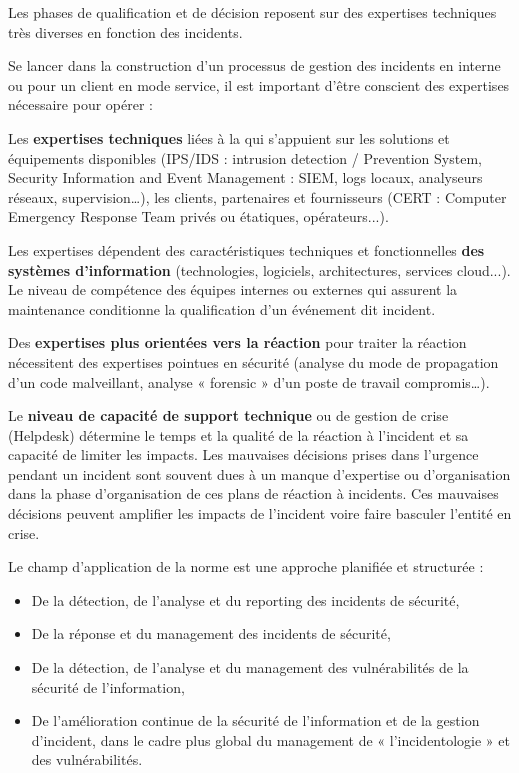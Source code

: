 Les phases de qualification et de décision reposent sur des expertises techniques très diverses en fonction des incidents.

Se lancer dans la construction d'un processus de gestion des incidents en interne ou pour un client en mode service, il est important d'être conscient des expertises nécessaire pour opérer :

Les \textbf{expertises techniques} liées à la \textbf{}qui s’appuient sur les solutions et équipements disponibles (IPS/IDS : intrusion detection / Prevention System, Security Information and Event Management : SIEM, logs locaux, analyseurs réseaux, supervision…), les clients,  partenaires et fournisseurs (CERT : Computer Emergency Response Team privés ou étatiques, opérateurs...).

Les expertises dépendent des caractéristiques techniques et fonctionnelles \textbf{des systèmes d’information} (technologies, logiciels, architectures, services cloud...). Le niveau de compétence des équipes internes ou externes qui assurent la maintenance conditionne la qualification  d’un événement dit incident. 

Des \textbf{expertises  plus orientées vers la réaction }pour traiter la réaction nécessitent des expertises pointues en sécurité (analyse du mode de propagation d’un code malveillant, analyse « forensic » d’un poste de travail  compromis…).

Le \textbf{niveau de capacité de support technique }ou de gestion de crise (Helpdesk) détermine le temps et la qualité de la réaction à l’incident et sa capacité de limiter les impacts. Les mauvaises décisions prises dans l’urgence pendant un incident sont souvent dues à un manque d’expertise ou d’organisation dans la phase d'organisation de ces plans de réaction à incidents. Ces mauvaises décisions peuvent amplifier les impacts de l’incident voire faire basculer l’entité en crise.

Le  champ d’application de la norme est une approche planifiée et structurée :
\begin{itemize}
  \item De la détection, de l'analyse et du reporting des incidents de sécurité,
  \item De la réponse et du management des incidents de sécurité,
  \item De la détection, de l’analyse et du management des vulnérabilités de la sécurité de l’information,
  \item De l’amélioration continue de la sécurité de l’information et de la gestion d’incident, dans le cadre plus global du management de « l’incidentologie » et des vulnérabilités.
\end{itemize}


